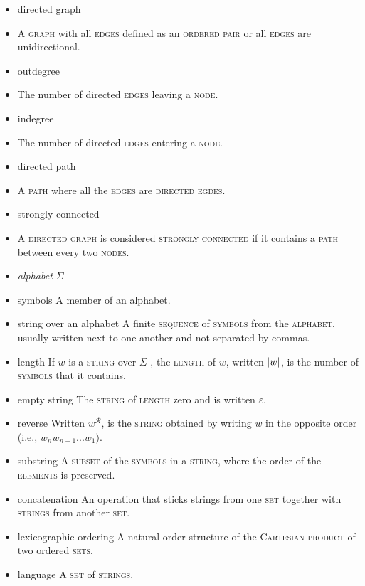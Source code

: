 \documentclass{article}
\newcommand{\term}[1]{\textsc{#1}}
\begin{document}
\begin{itemize}
\item directed graph
 \item A \term{graph} with all \term{edges} defined as an \term{ordered pair} or all \term{edges} are unidirectional.
\item outdegree
 \item The number of directed \term{edges} leaving a \term{node}.
\item indegree
 \item The number of directed \term{edges} entering a \term{node}.
\item directed path
 \item A \term{path} where all the \term{edges} are \term{directed egdes}.
\item strongly connected
 \item A \term{directed graph} is considered \term{strongly connected} if it contains a \term{path} between every two \term{nodes}.
\end{itemize}
   
\bigskip \indent
\begin{itemize}
\item \emph{alphabet} $\Sigma$

\item symbols
   \subitem A member of an alphabet.

\item string over an alphabet
   \subitem A finite \term{sequence} of \term{symbols} from the \term{alphabet}, usually written next to one another and not separated by commas.

\item length 
   \subitem If  $w$ is a \term{string} over  $\Sigma$ , the \term{length} of $w$, written $\abs{w}$, is the number of \term{symbols} that it contains.

\item empty string 
   \subitem The \term{string} of \term{length} zero and is written $\varepsilon$.

\item reverse
   \subitem Written $w^\mathcal{R}$, is the \term{string} obtained by writing $w$ in the opposite order (i.e., $w_{n}w_{n-1}...w_{1}).$

\item substring
   \subitem A \term{subset} of the \term{symbols} in a \term{string}, where the order of the \term{elements} is preserved.
   
\item concatenation
   \subitem An operation that sticks strings from one \term{set} together with \term{strings} from another \term{set}. 

\item lexicographic ordering
   \subitem A natural order structure of the \term{Cartesian product} of two ordered \term{sets}.

\item language
  \subitem A \term{set} of \term{strings}.

\end{itemize}
\end{document}
